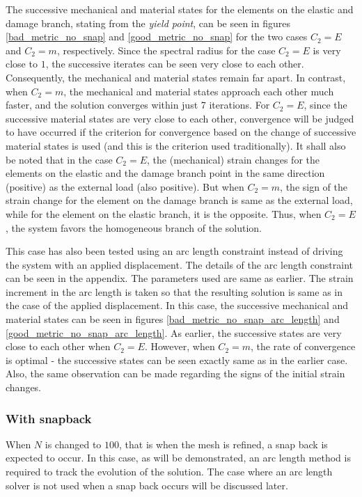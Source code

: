 \documentclass[11pt]{elsarticle}
\begin{document}
The successive mechanical and material states for the elements on the elastic and damage branch, stating from the \textit{yield point}, can be seen in figures \ref{bad_metric_no_snap} and \ref{good_metric_no_snap} for the two cases $C_2=E$ and $C_2=m$, respectively. Since the spectral radius for the case $C_2=E$ is very close to $1$, the successive iterates can be seen very close to each other. Consequently, the mechanical and material states remain far apart. In contrast, when $C_2=m$, the mechanical and material states approach each other much faster, and the solution converges within just 7 iterations. For $C_2=E$, since the successive material states are very close to each other, convergence will be judged to have occurred if the criterion for convergence based on the change of successive material states is used (and this is the criterion used traditionally). It shall also be noted that in the case $C_2=E$, the (mechanical) strain changes for the elements on the elastic and the damage branch point in the same direction (positive) as the external load (also positive). But when $C_2=m$, the sign of the strain change for the element on the damage branch is same as the external load, while for the element on the elastic branch, it is the opposite. Thus, when $C_2=E$, the system favors the homogeneous branch of the solution.

This case has also been tested using an arc length constraint instead of driving the system with an applied displacement. The details of the arc length constraint can be seen in the appendix. The parameters used are same as earlier. The strain increment in the arc length is taken so that the resulting solution is same as in the case of the applied displacement. In this case, the successive mechanical and material states can be seen in figures \ref{bad_metric_no_snap_arc_length} and \ref{good_metric_no_snap_arc_length}. As earlier, the successive states are very close to each other when $C_2=E$. However, when $C_2=m$, the rate of convergence is optimal - the successive states can be seen exactly same as in the earlier case. Also, the same observation can be made regarding the signs of the initial strain changes.

\subsubsection*{With snapback}

When $N$ is changed to $100$, that is when the mesh is refined, a snap back is expected to occur. In this case, as will be demonstrated, an arc length method is required to track the evolution of the solution. The case where an arc length solver is not used when a snap back occurs will be discussed later. 
\end{document}
